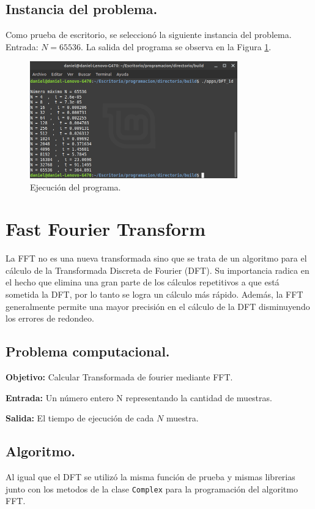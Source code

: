 \documentclass[12pt,letterpaper]{article}
\begin{document}
\subsection{Instancia del problema.}
Como prueba de escritorio, se seleccion\'o la siguiente instancia del problema. Entrada: $N=65536$. La salida del programa se observa en la Figura \ref{fig:DFT_1d}.
\begin{figure}[ht!]
  \centering
  \includegraphics[width=0.8\textwidth]{figures/DFT_1d}
  \caption{Ejecución del programa.}
  \label{fig:DFT_1d}
\end{figure}
\newpage

\section{Fast Fourier Transform}

La FFT no es una nueva transformada sino que se trata de un algoritmo para el c\'alculo de la Transformada Discreta de Fourier (DFT). Su importancia radica en el hecho que elimina una gran parte de los c\'alculos repetitivos a que est\'a sometida la DFT, por lo tanto se logra un c\'alculo m\'as r\'apido. Adem\'as, la FFT generalmente permite una mayor precisi\'on en el c\'alculo de la DFT disminuyendo los errores de redondeo.

\subsection{Problema computacional.}
\textbf{Objetivo:} Calcular Transformada de fourier mediante FFT.

\textbf{Entrada:} Un n\'umero entero N representando la cantidad de muestras.

\textbf{Salida:} El tiempo de ejecuci\'on de cada $N$ muestra.

\subsection{Algoritmo.}
Al igual que el DFT se utiliz\'o la misma funci\'on de prueba y mismas librerias junto con los metodos de la clase \texttt{Complex} para la programaci\'on del algoritmo FFT.
\end{document}
